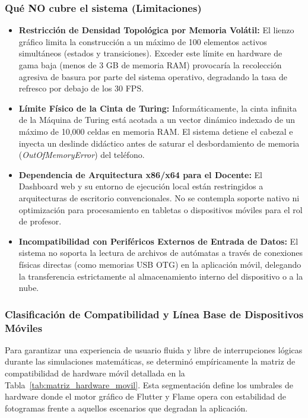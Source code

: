 \subsubsection{Qué NO cubre el sistema (Limitaciones)}
\begin{itemize}
    \item \textbf{Restricción de Densidad Topológica por Memoria Volátil:} El lienzo gráfico limita la construcción a un máximo de 100 elementos activos simultáneos (estados y transiciones). Exceder este límite en hardware de gama baja (menos de 3 GB de memoria RAM) provocaría la recolección agresiva de basura por parte del sistema operativo, degradando la tasa de refresco por debajo de los 30 FPS.
    \item \textbf{Límite Físico de la Cinta de Turing:} Informáticamente, la cinta infinita de la Máquina de Turing está acotada a un vector dinámico indexado de un máximo de 10,000 celdas en memoria RAM. El sistema detiene el cabezal e inyecta un deslinde didáctico antes de saturar el desbordamiento de memoria (\textit{OutOfMemoryError}) del teléfono.
    \item \textbf{Dependencia de Arquitectura x86/x64 para el Docente:} El Dashboard web y su entorno de ejecución local están restringidos a arquitecturas de escritorio convencionales. No se contempla soporte nativo ni optimización para procesamiento en tabletas o dispositivos móviles para el rol de profesor.
    \item \textbf{Incompatibilidad con Periféricos Externos de Entrada de Datos:} El sistema no soporta la lectura de archivos de autómatas a través de conexiones físicas directas (como memorias USB OTG) en la aplicación móvil, delegando la transferencia estrictamente al almacenamiento interno del dispositivo o a la nube.
\end{itemize}

\subsubsection{Clasificación de Compatibilidad y Línea Base de Dispositivos Móviles}
\label{subsubsec:linea_base_hardware}

Para garantizar una experiencia de usuario fluida y libre de interrupciones lógicas durante las simulaciones matemáticas, se determinó empíricamente la matriz de compatibilidad de hardware móvil detallada en la Tabla~\ref{tab:matriz_hardware_movil}. Esta segmentación define los umbrales de hardware donde el motor gráfico de Flutter y Flame opera con estabilidad de fotogramas frente a aquellos escenarios que degradan la aplicación.

